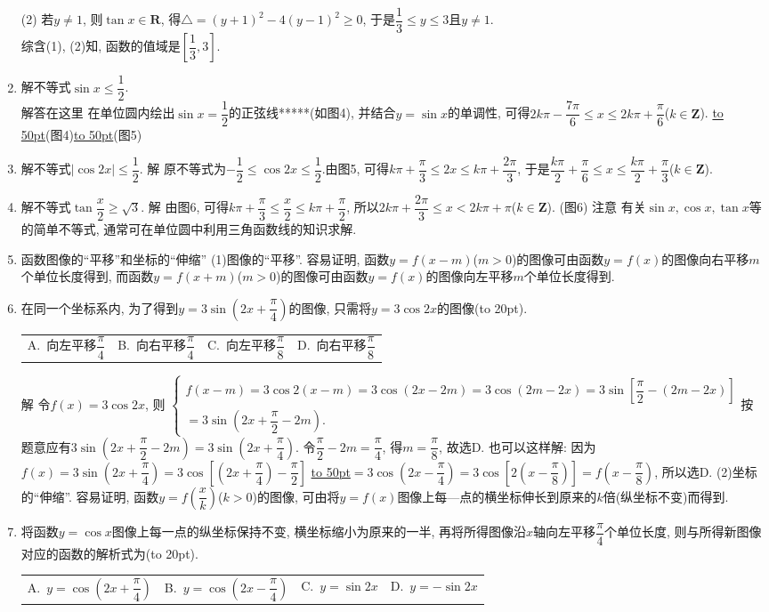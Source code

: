 \documentclass[10pt,a4paper]{article}
\newcommand{\blank}[1]{\underline{\hbox to #1pt{}}}
\newcommand{\bracket}[1]{(\hbox to #1pt{})}
\newcommand{\fourch}[4]{\par\begin{tabular}{p{.23\textwidth}p{.23\textwidth}p{.23\textwidth}p{.23\textwidth}}
A.~#1 &B.~#2& C.~#3& D.~#4
\end{tabular}}
\begin{document}
\begin{enumerate}[1.]
(2) 若$y\ne 1$, 则$\tan x\in \mathbf{R}$, 得$\triangle =(y+1)^2-4(y-1)^2\ge 0$, 于是$\dfrac 13\le y\le 3$且$y\ne 1$.\\
综含(1), (2)知, 函数的值域是$[\dfrac 13,3]$.
\item 解不等式$\sin x\le \dfrac 12$.\\
解答在这里  在单位圆内绘出$\sin x=\dfrac 12$的正弦线*****(如图4), 并结合$y=\sin x$的单调性, 可得$2k\pi -\dfrac{7\pi}6\le x\le 2k\pi +\dfrac{\pi}6$($k\in \mathbf{Z}$).
\blank{50}(图4)\blank{50}(图5)
\item 解不等式$|\cos 2x|\le \dfrac 12$.
解  原不等式为$-\dfrac 12\le \cos 2x\le \dfrac 12$.由图5, 可得$k\pi +\dfrac{\pi}3\le 2x\le k\pi +\dfrac{2\pi}3$,
于是$\dfrac{k\pi}2+\dfrac{\pi}6\le x\le \dfrac{k\pi}2+\dfrac{\pi}3$($k\in \mathbf{Z}$).
\item 解不等式$\tan \dfrac x2\ge \sqrt 3$.
解  由图6, 可得$k\pi +\dfrac{\pi}3\le \dfrac x2\le k\pi +\dfrac{\pi}2$,
所以$ 2k\pi +\dfrac{2\pi}3\le x<2k\pi +\pi$($k\in \mathbf{Z}$).
(图6)
注意  有关$\sin x,\cos x,\tan x$等的简单不等式, 通常可在单位圆中利用三角函数线的知识求解.
\item 函数图像的``平移''和坐标的``伸缩''
(1)图像的``平移''.
容易证明, 函数$y=f(x-m)$($m>0$)的图像可由函数$y=f(x)$的图像向右平移$m$个单位长度得到, 而函数$y=f(x+m)$($m>0$)的图像可由函数$y=f(x)$的图像向左平移$m$个单位长度得到.
\item 在同一个坐标系内, 为了得到$y=3\sin (2x+\dfrac{\pi}4)$的图像, 只需将$y=3\cos 2x$的图像\bracket{20}.
\fourch{向左平移$\dfrac{\pi}4$}{向右平移$\dfrac{\pi}4$}{向左平移$\dfrac{\pi}8$}{向右平移$\dfrac{\pi}8$}
解  令$f(x)=3\cos 2x$, 则
$\begin{cases} f(x-m)=3\cos 2(x-m)=3\cos (2x-2m)=3\cos (2m-2x)=3\sin [\dfrac{\pi}2-(2m-2x)] \\ =3\sin (2x+\dfrac{\pi}2-2m).
\end{cases}$按题意应有$3\sin (2x+\dfrac{\pi}2-2m)=3\sin (2x+\dfrac{\pi}4)$.
令$\dfrac{\pi}2-2m=\dfrac{\pi}4$, 得$m=\dfrac{\pi}8$, 故选D.
也可以这样解:
因为$ f(x)=3\sin (2x+\dfrac{\pi}4)=3\cos [(2x+\dfrac{\pi}4)-\dfrac{\pi}2]$
\blank{50}$=3\cos (2x-\dfrac{\pi}4)=3\cos [2(x-\dfrac{\pi}8)]=f(x-\dfrac{\pi}8)$,
所以选D.
(2)坐标的``伸缩''.
容易证明, 函数$y=f(\dfrac xk)$($k>0$)的图像, 可由将$y=f(x)$图像上每—点的横坐标伸长到原来的$k$倍(纵坐标不变)而得到.
\item 将函数$y=\cos x$图像上每一点的纵坐标保持不变, 横坐标缩小为原来的一半, 再将所得图像沿$x$轴向左平移$\dfrac{\pi}4$个单位长度, 则与所得新图像对应的函数的解析式为\bracket{20}.
\fourch{$y=\cos (2x+\dfrac{\pi}4)$}{$y=\cos (2x-\dfrac{\pi}4)$}{$y=\sin 2x$}{$y=-\sin 2x$}

\end{enumerate}
\end{document}
